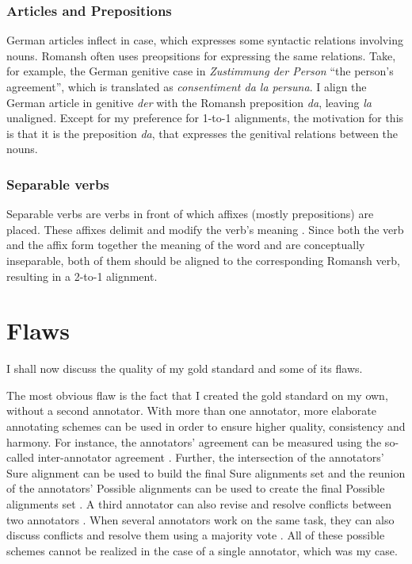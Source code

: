 \subsubsection{Articles and Prepositions}
German articles inflect in case, which expresses some syntactic relations involving nouns. 
Romansh often uses preopsitions for expressing the same relations. 
Take, for example, the German genitive case in \emph{Zustimmung der Person} \enquote{the person's agreement}, which is translated as \emph{consentiment da la persuna}. 
I align the German article in genitive  \emph{der} with the Romansh preposition \emph{da}, leaving \emph{la} unaligned. 
Except for my preference for 1-to-1 alignments, the motivation for this is that it is the preposition \emph{da}, that expresses the genitival relations between the nouns.

\subsubsection{Separable verbs}
Separable verbs are verbs in front of which affixes (mostly prepositions) are placed. 
These affixes delimit and modify the verb's meaning \autocite[47]{dryer-2009}. 
Since both the verb and the affix form together the meaning of the word and are conceptually inseparable, both of them should be aligned to the corresponding Romansh verb, resulting in a 2-to-1 alignment.

\section{Flaws}
\label{sec:gold-flaws}
I shall now discuss the quality of my gold standard and some of its flaws.

The most obvious flaw is the fact that I created the gold standard on my own, without a second annotator. 
With more than one annotator, more elaborate annotating schemes can be used in order to ensure higher quality, consistency and harmony. 
For instance, the annotators' agreement can be measured using the so-called inter-annotator agreement \autocite{holmqvist-ahrenberg-2011-gold}. 
Further, the intersection of the annotators' Sure alignment can be used to build the final Sure alignments set and the reunion of the annotators' Possible alignments can be used to create the final Possible alignments set \autocite{mihalcea-pedersen-2003-evaluation}.
A third annotator can also revise and resolve conflicts between two annotators \autocite{mihalcea-pedersen-2003-evaluation}.
When several annotators work on the same task, they can also discuss conflicts and resolve them using a majority vote \autocite{DBLP:journals/corr/cmp-lg-9805004}.
All of these possible schemes cannot be realized in the case of a single annotator, which was my case.

